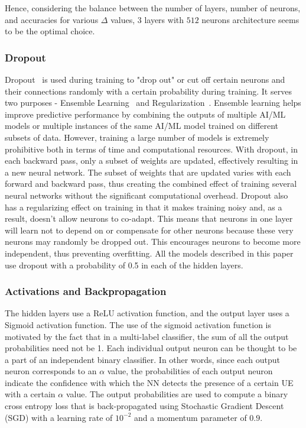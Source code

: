 \documentclass[journal]{IEEEtran}
\begin{document}
 Hence, considering the balance between the number of layers, number of neurons, and accuracies for various $\Delta$ values, 3 layers with $512$ neurons architecture seems to be the optimal choice.
 
\subsubsection{Dropout}
Dropout~\cite{srivastava2014dropout} is used during training to "drop out" or cut off certain neurons and their connections randomly with a certain probability during training. It serves two purposes - Ensemble Learning~\cite{hara2016analysis} and Regularization~\cite{Goodfellow-et-al-2016}. Ensemble learning helps improve predictive performance by combining the outputs of multiple AI/ML models or multiple instances of the same AI/ML model trained on different subsets of data. However, training a large number of models is extremely prohibitive both in terms of time and computational resources. With dropout, in each backward pass, only a subset of weights are updated, effectively resulting in a new neural network. The subset of weights that are updated varies with each forward and backward pass, thus creating the combined effect of training several neural networks without the significant computational overhead. Dropout also has a regularizing effect on training in that it makes training noisy and, as a result, doesn't allow neurons to co-adapt. This means that neurons in one layer will learn not to depend on or compensate for other neurons because these very neurons may randomly be dropped out. This encourages neurons to become more independent, thus preventing overfitting. All the models described in this paper use dropout with a probability of 0.5 in each of the hidden layers. 

\subsubsection{Activations and Backpropagation}
The hidden layers use a ReLU activation function, and the output layer uses a Sigmoid activation function. The use of the sigmoid activation function is motivated by the fact that in a multi-label classifier, the sum of all the output probabilities need not be 1. Each individual output neuron can be thought to be a part of an independent binary classifier. In other words, since each output neuron corresponds to an $\alpha$ value, the probabilities of each output neuron indicate the confidence with which the NN detects the presence of a certain UE with a certain $\alpha$ value. The output probabilities are used to compute a binary cross entropy loss that is back-propagated using Stochastic Gradient Descent (SGD) with a learning rate of $10^{-2}$ and a momentum parameter of $0.9$.
\end{document}

